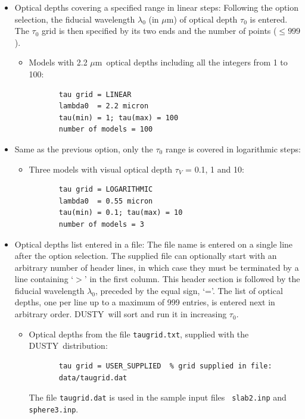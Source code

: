 \documentclass[11pt]{article}
\def\D    {{\sf DUSTY}}
\def\mic    {\hbox{$\mu$m}}
\begin{document}
\begin{itemize}

\item Optical depths covering a specified range in linear steps:
  Following the option selection, the fiducial wavelength $\lambda_0$
  (in \mic) of optical depth $\tau_0$ is entered.  The $\tau_0$ grid
  is then specified by its two ends and the number of points ($\le
  999$).

  \begin{itemize}
  \item Models with 2.2 \mic\ optical depths including all the
    integers from 1 to 100:

\begin{verbatim}
       tau grid = LINEAR
       lambda0  = 2.2 micron
       tau(min) = 1; tau(max) = 100
       number of models = 100
\end{verbatim}
  \end{itemize}

\item Same as the previous option, only the $\tau_0$ range is covered
  in logarithmic steps:

  \begin{itemize}
  \item Three models with visual optical depth $\tau_V$ = 0.1, 1 and
    10:
\begin{verbatim}
       tau grid = LOGARITHMIC
       lambda0  = 0.55 micron
       tau(min) = 0.1; tau(max) = 10
       number of models = 3
\end{verbatim}
  \end{itemize}

\item Optical depths list entered in a file: The file name is entered
  on a single line after the option selection. The supplied file can
  optionally start with an arbitrary number of header lines, in which
  case they must be terminated by a line containing `$>$' in the first
  column. This header section is followed by the fiducial wavelength
  $\lambda_0$, preceded by the equal sign, `='. The list of optical
  depths, one per line up to a maximum of 999 entries, is entered next
  in arbitrary order.  \D\ will sort and run it in increasing
  $\tau_0$.

  \begin{itemize}
  \item Optical depths from the file {\tt taugrid.txt}, supplied with
    the \D\ distribution:
\begin{verbatim}
       tau grid = USER_SUPPLIED  % grid supplied in file:
       data/taugrid.dat
\end{verbatim}
    The file {\tt taugrid.dat} is used in the sample input files {\tt
      slab2.inp} and {\tt sphere3.inp}.
  \end{itemize}
\end{itemize}
\end{document}
